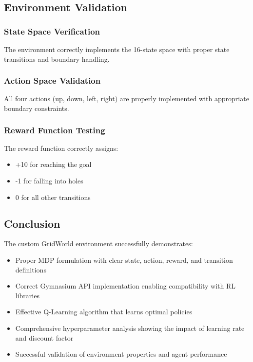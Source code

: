 \documentclass[12pt]{article}
\begin{document}
{{{\subsection{Environment Validation}

\subsubsection{State Space Verification}

The environment correctly implements the 16-state space with proper state transitions and boundary handling.

\subsubsection{Action Space Validation}

All four actions (up, down, left, right) are properly implemented with appropriate boundary constraints.

\subsubsection{Reward Function Testing}

The reward function correctly assigns:
\begin{itemize}
    \item +10 for reaching the goal
    \item -1 for falling into holes
    \item 0 for all other transitions
\end{itemize}

\subsection{Conclusion}

The custom GridWorld environment successfully demonstrates:

\begin{itemize}
    \item Proper MDP formulation with clear state, action, reward, and transition definitions
    \item Correct Gymnasium API implementation enabling compatibility with RL libraries
    \item Effective Q-Learning algorithm that learns optimal policies
    \item Comprehensive hyperparameter analysis showing the impact of learning rate and discount factor
    \item Successful validation of environment properties and agent performance
\end{itemize}

}}}
\end{document}
